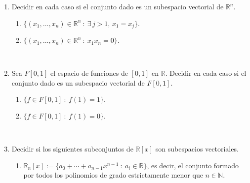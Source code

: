 \documentclass[12pt]{amsart}
\begin{document}
\begin{enumerate}[resume]

\item Decidir en cada caso si el conjunto dado es un subespacio vectorial de $\mathbb{R}^{n}$.
	\begin{enumerate}
		\item $\{(x_1, \ldots ,x_n) \in \mathbb{R}^n \ : \ \exists \, j > 1, \, x_1 = x_j\}$.
		\item $\{(x_1, \ldots , x_n) \in\mathbb{R}^n \ : \ x_1x_n = 0 \}$.
	\end{enumerate}

\

\item\label{sub funciones} Sea $F[0,1]$ el espacio de funciones de $[0,1]$ en $\mathbb{R}$. Decidir en cada caso si el conjunto dado es un subespacio vectorial de $F[0,1]$.
    \begin{enumerate}
	\item\label{sub funciones 1} $\{ f \in F[0,1] \ : \ f(1) = 1 \}$.
	\item\label{sub funciones 0} $\{ f \in F[0,1] \ : \ f(1) = 0\}$.
\end{enumerate}
    \
	
    \item\label{sub polinomios} Decidir si los siguientes subconjuntos de $\mathbb{R}[x]$ son subespacios vectoriales.

    \begin{enumerate}
     \item $\mathbb{R}_{n}[x] := \{ a_0 + \cdots + a_{n-1}x^{n-1} \ : \ a_i \in \mathbb{R}\}$, es decir, el conjunto formado por todos los polinomios de grado estrictamente menor que $n\in\mathbb{N}$.


\end{enumerate}
\end{enumerate}
\end{document}
